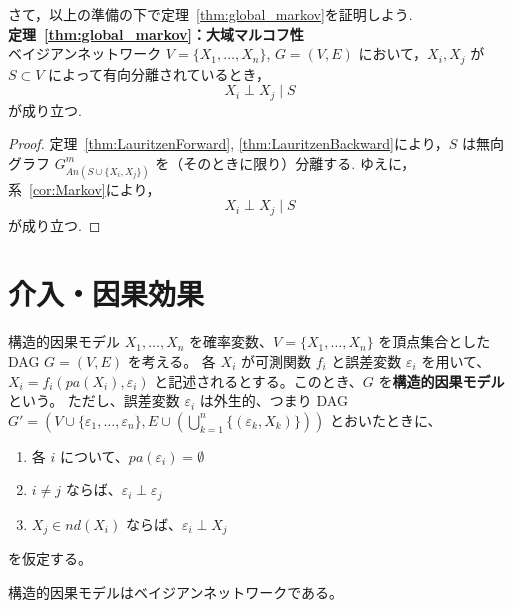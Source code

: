 \documentclass[uplatex, dvipdfmx]{jsarticle}
\begin{document}
さて，以上の準備の下で定理~\ref{thm:global_markov}を証明しよう.\\
\textbf{定理~\ref{thm:global_markov}：大域マルコフ性}\\
ベイジアンネットワーク $V = \{X_1, \dots, X_n\}$, $G = (V, E)$ において，$X_i, X_j$ が $S \subset V$ によって有向分離されているとき，
\begin{equation}
    X_i \perp X_j \mid S
\end{equation}
が成り立つ.

\begin{proof}
  定理~\ref{thm:LauritzenForward}, \ref{thm:LauritzenBackward}により，$S$ は無向グラフ $G^m_{An(S \cup \{X_i, X_j\})}$ を（そのときに限り）分離する.
  ゆえに，系~\ref{cor:Markov}により，
  \begin{equation}
      X_i \perp X_j \mid S
  \end{equation}
  が成り立つ.
\end{proof}

\newpage

\section{介入・因果効果}

\begin{defn}{構造的因果モデル}
  $X_1, \dots, X_n$ を確率変数、$V = \{X_1, \dots, X_n\}$ を頂点集合とした DAG $G = (V, E)$ を考える。
  各 $X_i$ が可測関数 $f_i$ と誤差変数 $\varepsilon_i$ を用いて、
  $ X_i = f_i(pa(X_i), \varepsilon_i) $
  と記述されるとする。このとき、$G$ を\textbf{構造的因果モデル}という。
  ただし、誤差変数 $\varepsilon_i$ は外生的、つまり DAG $G' = (V \cup \{\varepsilon_1, \dots, \varepsilon_n\}, E \cup (\bigcup_{k=1}^n \{(\varepsilon_k, X_k)\})) $ とおいたときに、
  \begin{enumerate}
      \item 各 $i$ について、$pa(\varepsilon_i) = \emptyset$
      \item $i \neq j$ ならば、$\varepsilon_i \perp \varepsilon_j$
      \item $X_j \in nd(X_i)$ ならば、$\varepsilon_i \perp X_j$
  \end{enumerate}
  を仮定する。
\end{defn}

\begin{prop}{}
  構造的因果モデルはベイジアンネットワークである。
\end{prop}
\end{document}
